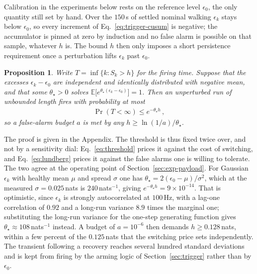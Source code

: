 \documentclass[lettersize,journal]{IEEEtran}
\newtheorem{proposition}{Proposition}
\newcommand{\E}{\mathbb{E}}
\begin{document}

Calibration in the experiments below rests on the reference level $\epsilon_0$, the only quantity still set by hand.
Over the $150$\,s of settled nominal walking $\epsilon_k$ stays below $\epsilon_0$, so every increment of Eq.~\ref{eq:trigger-cusum} is negative; the accumulator is pinned at zero by induction and no false alarm is possible on that sample, whatever $h$ is.
The bound $h$ then only imposes a short persistence requirement once a perturbation lifts $\epsilon_k$ past $\epsilon_0$.

\begin{proposition} \label{prop:fpr}
Write $T = \inf\{k : S_k > h\}$ for the firing time.
Suppose that the excesses $\epsilon_k - \epsilon_0$ are independent and identically distributed with negative mean, and that some $\theta_{\star} > 0$ solves $\E\big[e^{\theta_{\star}(\epsilon_k - \epsilon_0)}\big] = 1$.
Then an unperturbed run of unbounded length fires with probability at most
\begin{align} \label{eq:lundberg}
    \Pr(T < \infty) \leq e^{-\theta_{\star} h} \,,
\end{align}
so a false-alarm budget $a$ is met by any $h \geq \ln(1/a)/\theta_{\star}$.
\end{proposition}

The proof is given in the Appendix.
The threshold is thus fixed twice over, and not by a sensitivity dial: Eq.~\ref{eq:threshold} prices it against the cost of switching, and Eq.~\ref{eq:lundberg} prices it against the false alarms one is willing to tolerate.
The two agree at the operating point of Section~\ref{sec:exp-payload}.
For Gaussian $\epsilon_k$ with healthy mean $\mu$ and spread $\sigma$ one has $\theta_{\star} = 2(\epsilon_0 - \mu)/\sigma^2$, which at the measured $\sigma = 0.025$\,nats is $240$\,nats$^{-1}$, giving $e^{-\theta_{\star} h} = 9\times10^{-14}$.
That is optimistic, since $\epsilon_k$ is strongly autocorrelated at $100$\,Hz, with a lag-one correlation of $0.92$ and a long-run variance $8.9$ times the marginal one; substituting the long-run variance for the one-step generating function gives $\theta_{\star} \approx 108$\,nats$^{-1}$ instead.
A budget of $a = 10^{-6}$ then demands $h \geq 0.128$\,nats, within a few percent of the $0.125$\,nats that the switching price sets independently.
The transient following a recovery reaches several hundred standard deviations and is kept from firing by the arming logic of Section~\ref{sec:trigger} rather than by $\epsilon_0$.
\end{document}
